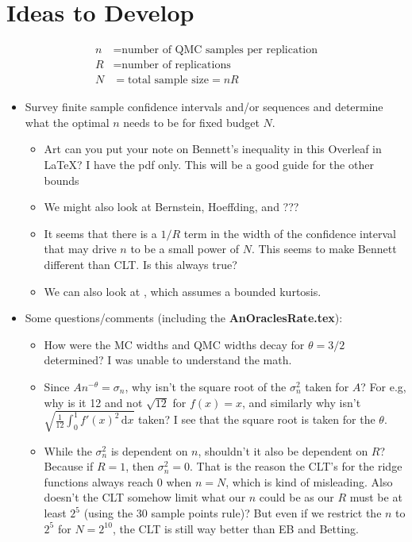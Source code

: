 \documentclass{amsart}
\newcommand{\rd}{\,\mathrm{d}}
\begin{document}
\section*{Ideas to Develop}
\begin{align*}
    n & = \text{number of QMC samples per replication} \\
    R & = \text{number of replications} \\
    N & = \text{total sample size} = nR
\end{align*}
\begin{itemize}
    \item Survey finite sample confidence intervals and/or sequences and determine what the optimal $n$ needs to be for fixed budget $N$.
    \begin{itemize}
        \item Art can you put your note on Bennett's inequality in this Overleaf in LaTeX?  I have the pdf only.  This will be a good guide for the other bounds
        \item We might also look at Bernstein, Hoeffding, and ???
        \item It seems that there is a $1/R$ term in the width of the confidence interval that may drive $n$ to be a small power of $N$.  This seems to make Bennett different than CLT.  Is this always true?
        \item We can also look at \cite{HicEtal14a}, which assumes a bounded kurtosis.
    \end{itemize} 
\item Some questions/comments (including the \textbf{AnOraclesRate.tex}):
    \begin{itemize}
        \item How were the MC widths and QMC widths decay for $\theta = 3/2$ determined? I was unable to understand the math.
        \item Since $An^{-\theta} = \sigma_n$, why isn't the square root of the $\sigma^2_n$ taken for $A$? For e.g, why is it 12 and not $\sqrt{12}$ for $f(x) = x$, and similarly why isn't $\sqrt{\frac1{12}\int_0^1 f'(x)^2\rd x}$ taken? I see that the square root is taken for the $\theta$.
        \item While the $\sigma^2_n$  is dependent on $n$, shouldn't it also be dependent on $R$? Because if $R = 1$, then $\sigma^2_n = 0$. That is the reason the CLT's for the ridge functions always reach $0$ when $n = N$, which is kind of misleading. Also doesn't the CLT somehow limit what our $n$ could be as our $R$ must be at least $2^5$ (using the 30 sample points rule)? But even if we restrict the $n$ to $2^5$ for $N = 2^{10}$, the CLT is still way better than EB and Betting. 

\end{itemize}
\end{itemize}
\end{document}

